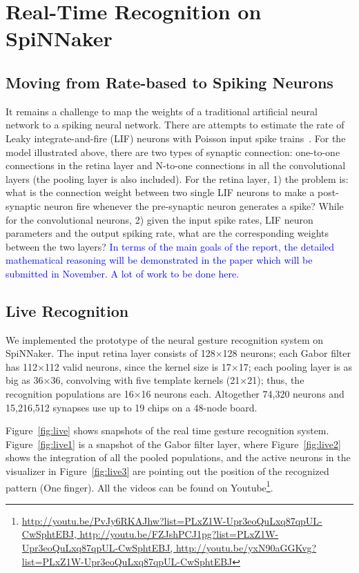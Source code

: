 \documentclass[journal]{journal}
\begin{document}
\section{Real-Time Recognition on SpiNNaker}

\subsection{Moving from Rate-based to Spiking Neurons}
It remains a challenge to map the weights of a traditional artificial neural network to a spiking neural network. 
There are attempts to estimate the rate of Leaky integrate-and-fire (LIF) neurons with Poisson input spike trains~\cite{la2008response}. 
For the model illustrated above, there are two types of synaptic connection: one-to-one connections in the retina layer and N-to-one connections in all the convolutional layers (the pooling layer is also included). 
For the retina layer, 1) the problem is: what is the connection weight between two single LIF neurons to make a post-synaptic neuron fire whenever the pre-synaptic neuron generates a spike? 
While for the convolutional neurons, 2) given the input spike rates, LIF neuron parameters and the output spiking rate, what are the corresponding weights between the two layers?
\textcolor{blue}{In terms of the main goals of the report, the detailed mathematical reasoning will be demonstrated in the paper which will be submitted in November. 
A lot of work to be done here.}

\subsection{Live Recognition}
We implemented the prototype of the neural gesture recognition system on SpiNNaker. 
The input retina layer consists of 128$\times$128 neurons; 
each Gabor filter has 112$\times$112 valid neurons, since the kernel size is 17$\times$17; 
each pooling layer is as big as 36$\times$36, convolving with five template kernels (21$\times$21); 
thus, the recognition populations are 16$\times$16 neurons each. Altogether 74,320 neurons and 15,216,512 synapses use up to 19 chips on a 48-node board.

Figure~\ref{fig:live} shows snapshots of the real time gesture recognition system. Figure~\ref{fig:live1} is a snapshot of the Gabor filter layer, where Figure~\ref{fig:live2} shows the integration of all the pooled populations, and the active neurons in the visualizer in Figure~\ref{fig:live3} are pointing out the position of the recognized pattern (One finger). All the videos can be found on Youtube\footnote{\url{
http://youtu.be/PvJy6RKAJhw?list=PLxZ1W-Upr3eoQuLxq87qpUL-CwSphtEBJ, http://youtu.be/FZJshPCJ1pg?list=PLxZ1W-Upr3eoQuLxq87qpUL-CwSphtEBJ, http://youtu.be/yxN90aGGKvg?list=PLxZ1W-Upr3eoQuLxq87qpUL-CwSphtEBJ}}.
\end{document}
